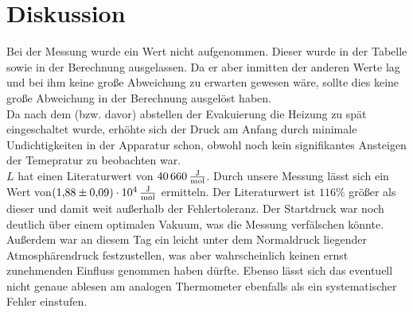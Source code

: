 \section{Diskussion}
\label{sec:Diskussion}

Bei der Messung wurde ein Wert nicht aufgenommen. Dieser wurde in der Tabelle sowie in der Berechnung ausgelassen. 
Da er aber inmitten der anderen Werte lag und bei ihm keine große Abweichung zu erwarten gewesen wäre, sollte dies keine große Abweichung in der 
Berechnung ausgelöst haben.\\
Da nach dem (bzw. davor) abstellen der Evakuierung die Heizung zu spät eingeschaltet wurde, erhöhte sich der Druck am Anfang durch 
minimale Undichtigkeiten in der Apparatur schon, obwohl noch kein signifikantes Ansteigen der Temepratur zu beobachten war.\\ \noindent
$L$ hat einen Literaturwert von $\SI{40 660}{\frac{\joule}{\mol}}$\cite{Gaskonstante}.
Durch unsere Messung lässt sich ein Wert von$\SI{1.88 +- 0.09e4}{\frac{\joule}{\mol}}$ ermitteln.
Der Literaturwert ist $116\%$ größer als dieser und damit weit außerhalb der Fehlertoleranz. \noindent
Der Startdruck war noch deutlich über einem optimalen Vakuum, was die Messung  verfälschen könnte.
Außerdem war an diesem Tag ein leicht unter dem Normaldruck liegender Atmosphärendruck festzustellen, was aber
wahrscheinlich keinen ernst zunehmenden Einfluss genommen haben dürfte.
Ebenso lässt sich das eventuell nicht genaue
ablesen am analogen Thermometer ebenfalls als ein systematischer Fehler einstufen.